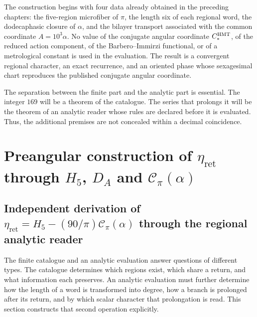 The construction begins with four data already obtained in the preceding
chapters: the five-region microfiber of \(\pi\), the length six of
each regional word, the dodecaphasic closure of \(\alpha\), and the bilayer
transport associated with the common coordinate
\(A=10^3\alpha\). No value of the conjugate angular coordinate \(C_*^{\rm HMT}\), of the reduced action
component, of the Barbero--Immirzi functional, or of a metrological constant is
used in the evaluation. The result is a convergent regional character,
an exact recurrence, and an oriented phase whose sexagesimal chart reproduces
the published conjugate angular coordinate.

The separation between the finite part and the analytic part is essential. The
integer \(169\) will be a theorem of the catalogue. The series that prolongs it will be the
theorem of an analytic reader whose rules are declared before it is evaluated.
Thus, the additional premises are not concealed within a decimal
coincidence.

\section{Preangular construction of \texorpdfstring{\(\eta_{\mathrm{ret}}\)}{eta_ret} through \texorpdfstring{\(H_5\)}{H5}, \texorpdfstring{\(D_A\)}{D_A} and \texorpdfstring{\(\mathscr C_\pi(\alpha)\)}{C_pi(alpha)}}
\label{sec:s102:c38:2}

\subsection{Independent derivation of \texorpdfstring{\(\eta_{\mathrm{ret}}=H_5-(90/\pi)\mathscr C_\pi(\alpha)\)}{eta_ret=H5-(90/pi)C_pi(alpha)} through the regional analytic reader}
\label{sec:s102:c38:2:1}


The finite catalogue and an analytic evaluation answer questions of different types. The catalogue determines which regions exist, which share a return, and what information each preserves. An analytic evaluation must further determine how the length of a word is transformed into degree, how a branch is prolonged after its return, and by which scalar character that prolongation is read. This section constructs that second operation explicitly.

